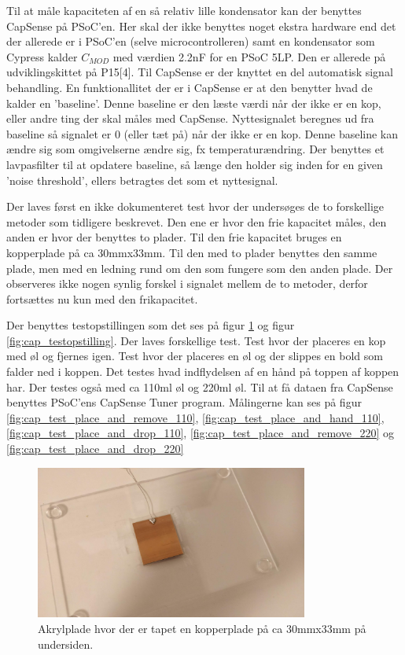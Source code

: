 \documentclass[HardwareDesign/HardwareDesign_main.tex]{subfiles}
\begin{document}
Til at måle kapaciteten af en så relativ lille kondensator kan der benyttes CapSense på PSoC'en. Her skal der ikke benyttes noget ekstra hardware end det der allerede er i PSoC'en (selve microcontrolleren) samt en kondensator som Cypress kalder $C_{MOD}$ med værdien 2.2nF for en PSoC 5LP. Den er allerede på udviklingskittet på P15[4].  Til CapSense er der knyttet en del automatisk signal behandling. En funktionallitet der er i CapSense er at den benytter hvad de kalder en 'baseline'. Denne baseline er den læste værdi når der ikke er en kop, eller andre ting der skal måles med CapSense. Nyttesignalet beregnes ud fra baseline så signalet er 0 (eller tæt på) når der ikke er en kop. Denne baseline kan ændre sig som omgivelserne ændre sig, fx temperaturændring. Der benyttes et lavpasfilter til at opdatere baseline, så længe den holder sig inden for en given 'noise threshold', ellers betragtes det som et nyttesignal.

Der laves først en ikke dokumenteret test hvor der undersøges de to forskellige metoder som tidligere beskrevet. Den ene er hvor den frie kapacitet måles, den anden er hvor der benyttes to plader. Til den frie kapacitet bruges en kopperplade på ca 30mmx33mm. Til den med to plader benyttes den samme plade, men med en ledning rund om den som fungere som den anden plade. Der observeres ikke nogen synlig forskel i signalet mellem de to metoder, derfor fortsættes nu kun med den frikapacitet.

Der benyttes testopstillingen som det ses på figur \ref{fig:cap_tape_testopstilling} og figur \ref{fig:cap_testopstilling}. 
Der laves forskellige test. Test hvor der placeres en kop med øl og fjernes igen. Test hvor der placeres en øl og der slippes en bold som falder ned i koppen. Det testes hvad indflydelsen af en hånd på toppen af koppen har. Der testes også med ca 110ml øl og 220ml øl. Til at få dataen fra CapSense benyttes PSoC'ens CapSense Tuner program. Målingerne kan ses på figur \ref{fig:cap_test_place_and_remove_110}, \ref{fig:cap_test_place_and_hand_110}, \ref{fig:cap_test_place_and_drop_110}, \ref{fig:cap_test_place_and_remove_220} og \ref{fig:cap_test_place_and_drop_220}


\begin{figure}[H]
    \centering
    \includegraphics[width=0.8\textwidth]{HardwareDesign/CupSensor/graphics/CapTest/tape_plate.jpg}
    \caption{Akrylplade hvor der er tapet en kopperplade på ca 30mmx33mm på undersiden.}
    \label{fig:cap_tape_testopstilling}
\end{figure}
\end{document}
